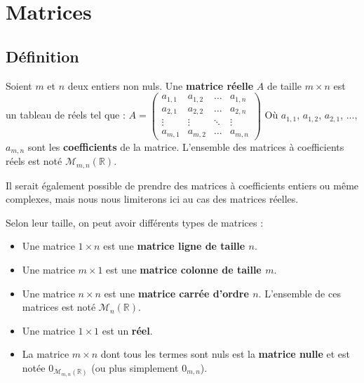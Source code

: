


	
	\section{Matrices}
	
	\subsection{Définition}
	
	\begin{formula}[Définition]
		Soient $m$ et $n$ deux entiers non nuls. Une \textbf{matrice réelle} $A$ de taille $m \times n$ est un tableau de réels tel que :
		\newpar
		$\displaystyle{A = \begin{pmatrix}a_{1,1} & a_{1,2} & \dots & a_{1,n} \\ a_{2,1} & a_{2,2} & \dots & a_{2,n} \\ \vdots & \vdots & \ddots & \vdots \\ a_{m,1} & a_{m,2} & \dots & a_{m,n}\end{pmatrix}}$
		\newpar
		Où $a_{1,1}$, $a_{1,2}$, $a_{2,1}$, ..., $a_{m,n}$ sont les \textbf{coefficients} de la matrice. L'ensemble des matrices à coefficients réels est noté $\mathcal{M}_{m,n}(\mathbb{R})$.
	\end{formula}
	
	Il serait également possible de prendre des matrices à coefficients entiers ou même complexes, mais nous nous limiterons ici au cas des matrices réelles.
	
	\begin{formula}
		Selon leur taille, on peut avoir différents types de matrices :
		\begin{itemize}
			\item Une matrice $1 \times n$ est une \textbf{matrice ligne de taille $n$}.
			\item Une matrice $m \times 1$ est une \textbf{matrice colonne de taille $m$}.
			\item Une matrice $n \times n$ est une \textbf{matrice carrée d'ordre $n$}. L'ensemble de ces matrices est noté $\mathcal{M}_n(\mathbb{R})$.
			\item Une matrice $1 \times 1$ est un \textbf{réel}.
			\item La matrice $m \times n$ dont tous les termes sont nuls est la \textbf{matrice nulle} et est notée $0_{\mathcal{M}_{m,n}(\mathbb{R})}$ (ou plus simplement $0_{m,n}$).
		\end{itemize}
	\end{formula}
	
